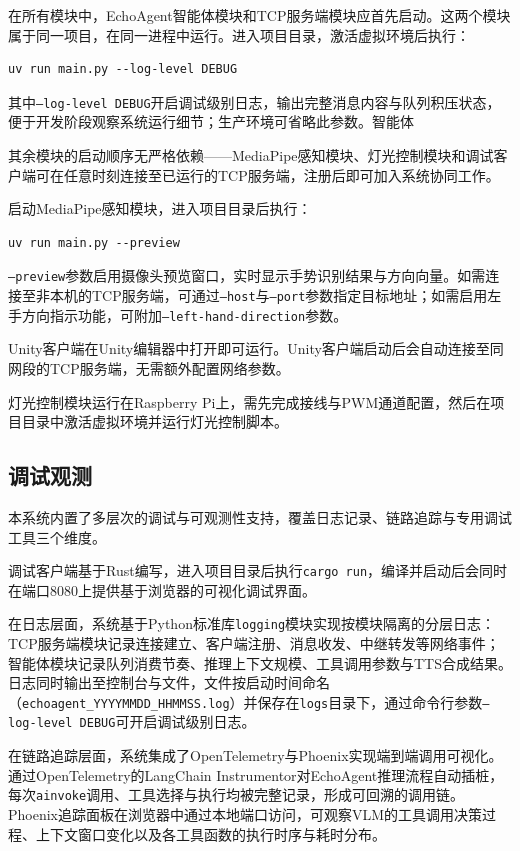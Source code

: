\documentclass[bachelor]{njupthesis}
\begin{document}
在所有模块中，EchoAgent智能体模块和TCP服务端模块应首先启动。这两个模块属于同一项目，在同一进程中运行。进入项目目录，激活虚拟环境后执行：

\lstset{style=codeblock}\begin{lstlisting}
uv run main.py --log-level DEBUG
\end{lstlisting}

其中\texttt{--log-level DEBUG}开启调试级别日志，输出完整消息内容与队列积压状态，便于开发阶段观察系统运行细节；生产环境可省略此参数。智能体

其余模块的启动顺序无严格依赖——MediaPipe感知模块、灯光控制模块和调试客户端可在任意时刻连接至已运行的TCP服务端，注册后即可加入系统协同工作。

启动MediaPipe感知模块，进入项目目录后执行：

\lstset{style=codeblock}\begin{lstlisting}
uv run main.py --preview
\end{lstlisting}

\texttt{--preview}参数启用摄像头预览窗口，实时显示手势识别结果与方向向量。如需连接至非本机的TCP服务端，可通过\texttt{--host}与\texttt{--port}参数指定目标地址；如需启用左手方向指示功能，可附加\texttt{--left-hand-direction}参数。

Unity客户端在Unity编辑器中打开即可运行。Unity客户端启动后会自动连接至同网段的TCP服务端，无需额外配置网络参数。

灯光控制模块运行在Raspberry Pi上，需先完成接线与PWM通道配置，然后在项目目录中激活虚拟环境并运行灯光控制脚本。

\subsection{调试观测}

本系统内置了多层次的调试与可观测性支持，覆盖日志记录、链路追踪与专用调试工具三个维度。

调试客户端基于Rust编写，进入项目目录后执行\texttt{cargo run}，编译并启动后会同时在端口8080上提供基于浏览器的可视化调试界面。

在日志层面，系统基于Python标准库\texttt{logging}模块实现按模块隔离的分层日志：TCP服务端模块记录连接建立、客户端注册、消息收发、中继转发等网络事件；智能体模块记录队列消费节奏、推理上下文规模、工具调用参数与TTS合成结果。日志同时输出至控制台与文件，文件按启动时间命名（\texttt{echoagent\_YYYYMMDD\_HHMMSS.log}）并保存在\texttt{logs}目录下，通过命令行参数\texttt{--log-level DEBUG}可开启调试级别日志。

在链路追踪层面，系统集成了OpenTelemetry与Phoenix实现端到端调用可视化。通过OpenTelemetry的LangChain Instrumentor对EchoAgent推理流程自动插桩，每次\texttt{ainvoke}调用、工具选择与执行均被完整记录，形成可回溯的调用链。Phoenix追踪面板在浏览器中通过本地端口访问，可观察VLM的工具调用决策过程、上下文窗口变化以及各工具函数的执行时序与耗时分布。
\end{document}

